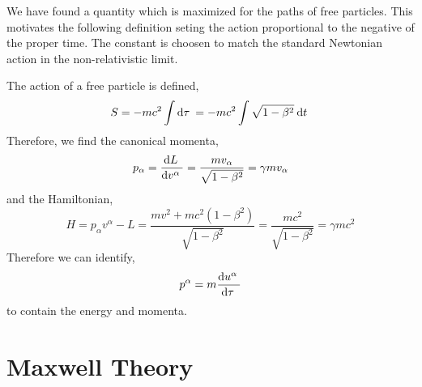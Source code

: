\documentclass[11pt, a4paper]{article}
\begin{document}
\begin{remark}
We have found a quantity which is maximized for the paths of free particles. This motivates the following definition seting the action proportional to the negative of the proper time. The constant is choosen to match the standard Newtonian action in the non-relativistic limit.
\end{remark} 

\begin{definition}
The action of a free particle is defined,
\[ S = - mc^2 \int \mathrm{d}\tau \: = - mc^2 \int \sqrt{1 - \beta^2} \: \mathrm{d}t \: \]
Therefore, we find the canonical momenta,
\[ p_\alpha = \frac{\mathrm{d}L \:}{\mathrm{d}v^\alpha \:} = \frac{m v_\alpha}{\sqrt{1 - \beta^2}} = \gamma m v_\alpha \]
and the Hamiltonian,
\[ H = p_\alpha v^\alpha - L = \frac{m v^2 + m c^2(1 - \beta^2)}{\sqrt{1 - \beta^2}} = \frac{mc^2}{\sqrt{1 - \beta^2}} = \gamma m c^2 \]
Therefore we can identify,
\[ p^\alpha = m \frac{\mathrm{d}u^\alpha \:}{\mathrm{d}\tau \:} \]
to contain the energy and momenta. 
\end{definition}

\section{Maxwell Theory}
\end{document}
